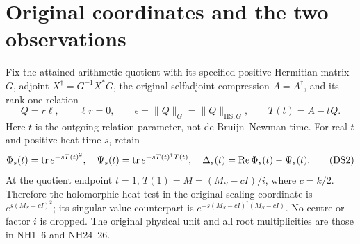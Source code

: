 \documentclass[11pt]{article}
\begin{document}
\section{Original coordinates and the two observations}
Fix the attained arithmetic quotient with its specified positive
Hermitian matrix \(G\), adjoint \(X^\dagger=G^{-1}X^*G\), the original
selfadjoint compression \(A=A^\dagger\), and its rank-one relation
\[
 Q=r\ell,\qquad \ell r=0,\qquad
 \epsilon=\|Q\|_G=\|Q\|_{\mathrm{HS},G},\qquad T(t)=A-tQ .
 \tag{DS1}
\]
Here \(t\) is the outgoing-relation parameter, not de Bruijn--Newman
time. For real \(t\) and positive heat time \(s\), retain
\[
 \Phi_s(t)=\operatorname{tr} e^{-sT(t)^2},\quad
 \Psi_s(t)=\operatorname{tr} e^{-sT(t)^\dagger T(t)},\quad
 \Delta_s(t)=\operatorname{Re}\Phi_s(t)-\Psi_s(t).
 \tag{DS2}
\]
At the quotient endpoint \(t=1\), \(T(1)=M=(M_S-cI)/i\), where
\(c=k/2\). Therefore the holomorphic heat test in the original scaling
coordinate is \(e^{s(M_S-cI)^2}\); its singular-value counterpart is
\(e^{-s(M_S-cI)^\dagger(M_S-cI)}\). No centre or factor \(i\) is dropped.
The original physical unit and all root multiplicities are those in
NH1--6 and NH24--26.
\end{document}
